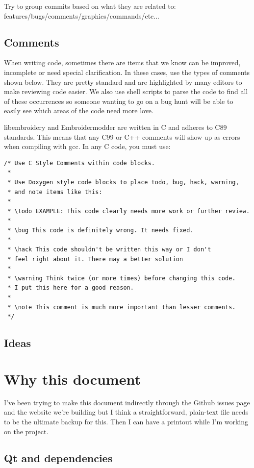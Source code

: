 \documentclass[11pt]{report}
\newcommand{\todo}[1]{\marginpar{\emph{TODO}\\{\footnotesize #1}}}
\begin{document}
Try to group commits based on what they are related to:
features/bugs/comments/graphics/commands/etc...

\subsection{Comments}

When writing code, sometimes there are items that we know can be
improved, incomplete or need special clarification. In these cases, use
the types of comments shown below. They are pretty standard and are
highlighted by many editors to make reviewing code easier. We also use
shell scripts to parse the code to find all of these occurrences so
someone wanting to go on a bug hunt will be able to easily see which
areas of the code need more love.

libembroidery and Embroidermodder are written in C and adheres to C89 standards. This means
that any C99 or C++ comments will show up as errors when compiling with
gcc. In any C code, you must use:

\begin{lstlisting}
/* Use C Style Comments within code blocks.
 *
 * Use Doxygen style code blocks to place todo, bug, hack, warning,
 * and note items like this:
 *
 * \todo EXAMPLE: This code clearly needs more work or further review.
 *
 * \bug This code is definitely wrong. It needs fixed.
 *
 * \hack This code shouldn't be written this way or I don't
 * feel right about it. There may a better solution
 *
 * \warning Think twice (or more times) before changing this code.
 * I put this here for a good reason.
 *
 * \note This comment is much more important than lesser comments.
 */
\end{lstlisting}

\subsection{Ideas}

\section{Why this document}

I've been trying to make this document indirectly through the Github
issues page and the website we're building but I think a
straightforward, plain-text file needs to be the ultimate backup for
this. Then I can have a printout while I'm working on the project.

\subsection{Qt and dependencies}
\end{document}
